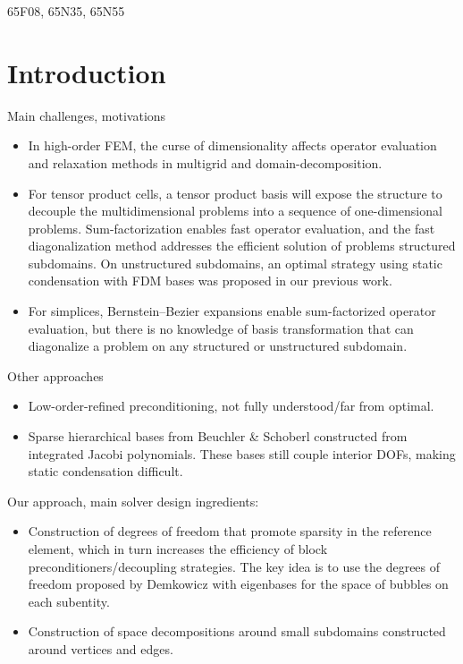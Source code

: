 \documentclass[review,onefignum,onetabnum,a4paper]{siamart190516}
\begin{document}
\begin{AMS}
   65F08, 65N35, 65N55
\end{AMS}


\section{Introduction} \label{sec:introduction}


Main challenges, motivations
\begin{itemize}
\item In high-order FEM, the curse of dimensionality affects operator
   evaluation and relaxation methods in multigrid and domain-decomposition.  
\item For tensor product cells,
   a tensor product basis will expose the structure to decouple the
   multidimensional problems into a sequence of one-dimensional problems.
   Sum-factorization enables fast operator evaluation, and the fast
   diagonalization method addresses the efficient solution of problems
   structured subdomains.  On unstructured subdomains, an optimal strategy
   using static condensation with FDM bases was proposed in our previous
   work.
\item For simplices, Bernstein--Bezier expansions enable sum-factorized
   operator evaluation, but there is no knowledge of basis transformation
   that can diagonalize a problem on any structured or unstructured subdomain.
\end{itemize}


Other approaches
\begin{itemize}
\item Low-order-refined preconditioning, not fully understood/far from optimal.
\item Sparse hierarchical bases from Beuchler \& Schoberl constructed from integrated Jacobi polynomials. 
   These bases still couple interior DOFs, making static condensation difficult.
\end{itemize}


Our approach, main solver design ingredients:
\begin{itemize}
\item Construction of degrees of freedom that promote sparsity in the reference element, 
   which in turn increases the efficiency of block preconditioners/decoupling strategies. The key idea is
      to use the degrees of freedom proposed by Demkowicz with eigenbases for the space of bubbles on each subentity.
\item Construction of space decompositions around small subdomains constructed around vertices and edges.
\end{itemize}
\end{document}
